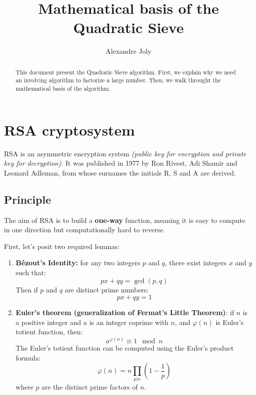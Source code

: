\documentclass[a4paper, 11pt]{article}
\title{Mathematical basis of the Quadratic Sieve}
\author{Alexandre Joly}
\begin{document}
\maketitle

\begin{abstract}
    This document present the Quadratic Sieve algorithm. First, we explain why we need an involving algorithm to factorize a large number. Then, we walk throught the mathematical basis of the algorithm.
\end{abstract}

\tableofcontents
\newpage


\section{RSA cryptosystem}

RSA is an asymmetric encryption system \textit{(public key for encryption and private key for decryption)}. It was published in 1977 by Ron Rivest, Adi Shamir and Leonard Adleman, from whose surnames the initials R, S and A are derived.

\subsection{Principle}
The aim of RSA is to build a \textbf{one-way} function, meaning it is easy to compute in one direction but computationally hard to reverse.

First, let's posit two required lemmas:
\begin{enumerate}
    \item \textbf{Bézout's Identity:} for any two integers $p$ and $q$, there exist integers $x$ and $y$ such that:
    \begin{equation}
        px+qy= \gcd(p,q) 
    \end{equation}
    Then if $p$ and $q$ are distinct prime numbers:
    \begin{equation}
        px+qy= 1
    \end{equation}
    \item \textbf{Euler's theorem (generalization of Fermat's Little Theorem)}: if $n$ is a positive integer and $a$ is an integer coprime with $n$, and $\varphi(n)$ is Euler's totient function, then:
    \begin{equation}
        a^{\varphi(n)} \equiv 1 \mod n
    \end{equation}
    The Euler's totient function can be computed using the Euler's product formula:
    \begin{equation}
        \varphi(n) = n \prod_{p|n}\left(1-\frac{1}{p}\right)
    \end{equation}
    where $p$ are the distinct prime factors of $n$.
\end{enumerate}
\end{document}
